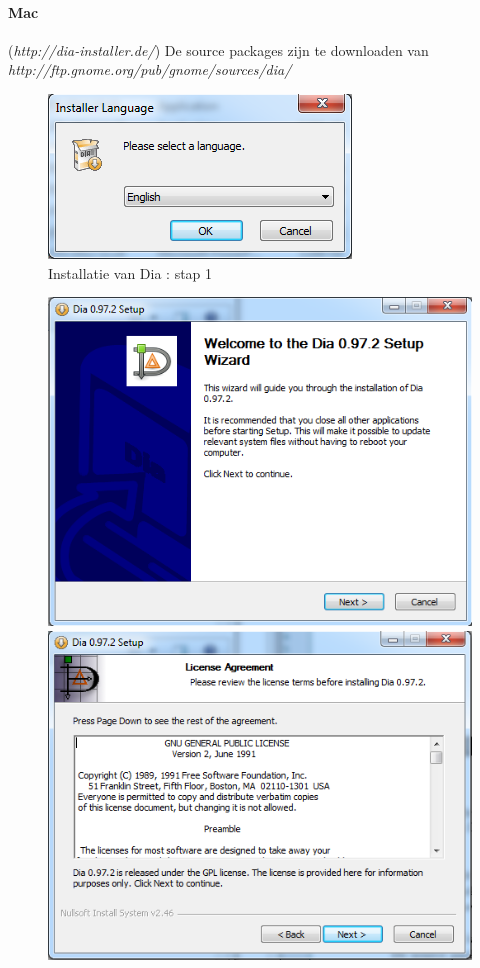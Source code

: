 \documentclass[12pt,a4paper]{report}
\begin{document}
\begin{flushleft}
\paragraph*{Mac}
(\textit{http://dia-installer.de/})\linebreak
De source packages zijn te downloaden van \textit{http://ftp.gnome.org/pub/gnome/sources/dia/}
\begin{figure}[H]
\includegraphics[scale=0.75]{images/install_02.png}
\centering
\vspace{-10pt}
\caption{Installatie van Dia : stap 1}
\end{figure}
\begin{figure}[H]
\includegraphics[scale=0.5]{images/install_03.png}
\includegraphics[scale=0.5]{images/install_04.png}

\end{figure}
\end{flushleft}
\end{document}

